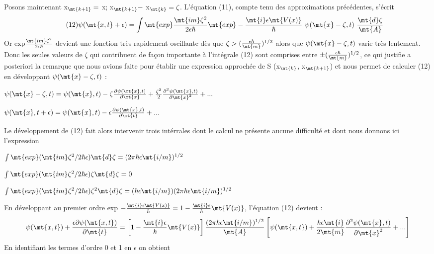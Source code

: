 Posons maintenant
x$_\mt{k+1} =$ x; x$_\mt{k+1} -$ x$_\mt{k}=\zeta$.
L'équation (11), compte tenu des approximations précédentes, s'écrit
\[
\tag{12}\psi(\mt{x, t}+\epsilon) = \int 
\mt{exp}\frac{\mt{im}\zeta^2}{2\epsilon\hbar}
\mt{exp}-\frac{\mt{i}\epsilon\mt{V(x)}}{\hbar}
\ \psi(\mt{x}-\zeta,t)\ \frac{\mt{d}\zeta}{\mt{A}}
\]
Or exp$\frac{\mt{im}\zeta^2}{2\epsilon\hbar}$ devient une fonction très rapidement oscillante dès que
$\zeta > (\frac{\epsilon\hbar}{\mt{m}})^{1/2}$
alors que $\psi(\mt{x}-\zeta,t)$ varie très lentement. Donc les seules
valeurs de $\zeta$ qui contribuent de façon importante à l'intégrale (12) sont
comprises entre $\pm(\frac{\epsilon\hbar}{\mt{m}})^{1/2}$, ce qui justifie a posteriori la remarque que
nous avions faite pour établir une expression approchée de S (x$_\mt{k}$, x$_\mt{k+1}$) et
nous permet de calculer (12) en développant $\psi(\mt{x}-\zeta,t)$ :
\begin{center}
$\psi(\mt{x}-\zeta,t) = \psi(\mt{x},t)-\zeta\frac{\partial\psi(\mt{x},t)}{\partial\mt{x}}
+\frac{\zeta^2}{2}\frac{\partial^2\psi(\mt{x},t)}{\partial\mt{x}^2} + ...$

$\psi(\mt{x},t+\epsilon) = \psi(\mt{x},t)-\epsilon\frac{\partial\psi(\mt{x},t)}{\partial\mt{t}} + ...$
\end{center}

Le développement de (12) fait alors intervenir trois intérrales
dont le calcul ne présente aucune difficulté et dont nous donnons ici
l'expression
\begin{center}$
\int\mt{exp}(\mt{im}\zeta^2/2\hbar\epsilon)\mt{d}\zeta = (2\pi\hbar\epsilon\mt{i/m})^{1/2}$
\end{center}
\begin{center}
$\int\mt{exp}(\mt{im}\zeta^2/2\hbar\epsilon)\zeta\mt{d}\zeta = 0$
\end{center}
\begin{center}
$\int\mt{exp}(\mt{im}\zeta^2/2\hbar\epsilon)\zeta^2\mt{d}\zeta =
(\hbar\epsilon\mt{i/m})(2\pi\hbar\epsilon\mt{i/m})^{1/2}
$\end{center}
En développant au premier ordre exp
$-\frac{\mt{i}\epsilon\mt{V(x)}}{\hbar}=1-\frac{\mt{i}\epsilon}{\hbar}\mt{V(x)}$, l'équation
(12) devient : 
\[
\psi(\mt{x,t})+\frac{\epsilon\partial\psi(\mt{x,t})}{\partial\mt{t}} =
\left[1-\frac{\mt{i}\epsilon}{\hbar}\mt{V(x)}\right]
\frac{(2\pi\hbar\epsilon\mt{i/m})^{1/2}}{\mt{A}}
\left[\psi(\mt{x,t})+\frac{\hbar\epsilon\mt{i}}{2\mt{m}}
\frac{\partial^2\psi(\mt{x},t)}{\partial\mt{x}^2}+...\right]
\]
En identifiant les termes d'ordre 0 et 1 en $\epsilon$ on obtient


